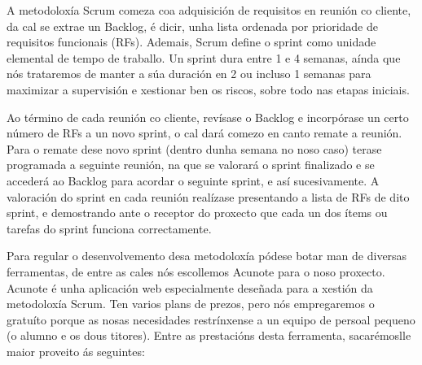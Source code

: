 A metodoloxía Scrum comeza coa adquisición de requisitos en reunión co cliente, da cal se extrae un Backlog, é dicir, unha lista ordenada por prioridade de requisitos funcionais (RFs). Ademais, Scrum define o sprint como unidade elemental de tempo de traballo. Un sprint dura entre 1 e 4 semanas, aínda que nós trataremos de manter a súa duración en 2 ou incluso 1 semanas para maximizar a supervisión e xestionar ben os riscos, sobre todo nas etapas iniciais.

Ao término de cada reunión co cliente, revísase o Backlog e incorpórase un certo número de RFs a un novo sprint, o cal dará comezo en canto remate a reunión. Para o remate dese novo sprint (dentro dunha semana no noso caso) terase programada a seguinte reunión, na que se valorará o sprint finalizado e se accederá ao Backlog para acordar o seguinte sprint, e así sucesivamente. A valoración do sprint en cada reunión realízase presentando a lista de RFs de dito sprint, e demostrando ante o receptor do proxecto que cada un dos ítems ou tarefas do sprint funciona correctamente.

Para regular o desenvolvemento desa metodoloxía pódese botar man de diversas ferramentas, de entre as cales nós escollemos Acunote \cite{acunote} para o noso proxecto. Acunote é unha aplicación web especialmente deseñada para a xestión da metodoloxía Scrum. Ten varios plans de prezos, pero nós empregaremos o gratuíto porque as nosas necesidades restrínxense a un equipo de persoal pequeno (o alumno e os dous titores). Entre as prestacións desta ferramenta, sacarémoslle maior proveito ás seguintes:


